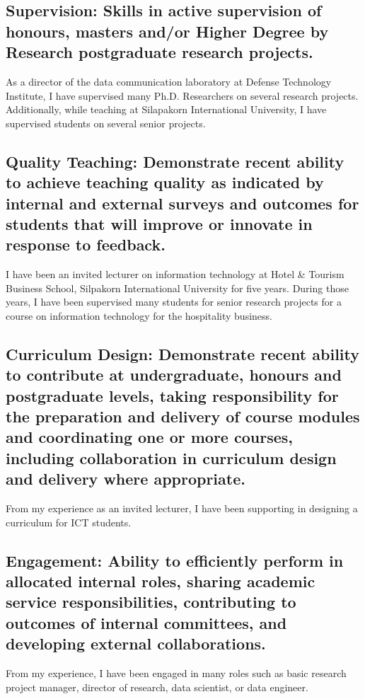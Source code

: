 \documentclass[12pt]{article}
\begin{document}
\subsection*{Supervision: Skills in active supervision of honours, masters and/or Higher Degree by Research postgraduate research projects.}

{\bfseries } As a director of the data communication laboratory at Defense Technology Institute, I have supervised many Ph.D. Researchers on several research projects. Additionally, while teaching at Silapakorn International University, I have supervised students on several senior projects.

\subsection*{Quality Teaching: Demonstrate recent ability to achieve teaching quality as indicated by internal and external surveys and outcomes for students that will improve or innovate in response to feedback.}

{\bfseries }I have been an invited lecturer on information technology at Hotel \& Tourism Business School, Silpakorn International University for five years. During those years, I have been supervised many students for senior research projects for a course on information technology for the hospitality business.

\subsection*{Curriculum Design: Demonstrate recent ability to contribute at undergraduate, honours and postgraduate levels, taking responsibility for the preparation and delivery of course modules and coordinating one or more courses, including collaboration in curriculum design and delivery where appropriate.}
{\bfseries} From my experience as an invited lecturer, I have been supporting in designing a curriculum for ICT students.

\subsection*{Engagement: Ability to efficiently perform in allocated internal roles, sharing academic service responsibilities, contributing to outcomes of internal committees, and developing external collaborations.}
{\bfseries }From my experience, I have been engaged in many roles such as basic research project manager, director of research, data scientist, or data engineer.
\end{document}
